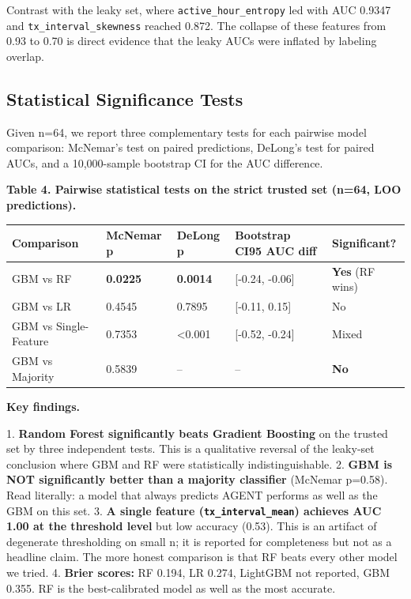 \documentclass[sigconf,nonacm=false]{acmart}
\begin{document}
Contrast with the leaky set, where \texttt{active\_hour\_entropy} led with AUC 0.9347 and \texttt{tx\_interval\_skewness} reached 0.872. The collapse of these features from 0.93 to 0.70 is direct evidence that the leaky AUCs were inflated by labeling overlap.

\subsection{Statistical Significance Tests}

Given n=64, we report three complementary tests for each pairwise model comparison: McNemar's test on paired predictions, DeLong's test for paired AUCs, and a 10,000-sample bootstrap CI for the AUC difference.

\textbf{Table 4. Pairwise statistical tests on the strict trusted set (n=64, LOO predictions).}

\begin{table}[h]
\centering
\small
\begin{tabular}{lllll}
\toprule
Comparison & McNemar p & DeLong p & Bootstrap CI95 AUC diff & Significant? \\
\midrule
GBM vs RF & \textbf{0.0225} & \textbf{0.0014} & [-0.24, -0.06] & \textbf{Yes} (RF wins) \\
GBM vs LR & 0.4545 & 0.7895 & [-0.11, 0.15] & No \\
GBM vs Single-Feature & 0.7353 & <0.001 & [-0.52, -0.24] & Mixed \\
GBM vs Majority & 0.5839 & -- & -- & \textbf{No} \\
\bottomrule
\end{tabular}
\end{table}

\textbf{Key findings.}

1. \textbf{Random Forest significantly beats Gradient Boosting} on the trusted set by three independent tests. This is a qualitative reversal of the leaky-set conclusion where GBM and RF were statistically indistinguishable.
2. \textbf{GBM is NOT significantly better than a majority classifier} (McNemar p=0.58). Read literally: a model that always predicts AGENT performs as well as the GBM on this set.
3. \textbf{A single feature (\texttt{tx\_interval\_mean}) achieves AUC 1.00 at the threshold level} but low accuracy (0.53). This is an artifact of degenerate thresholding on small n; it is reported for completeness but not as a headline claim. The more honest comparison is that RF beats every other model we tried.
4. \textbf{Brier scores:} RF 0.194, LR 0.274, LightGBM not reported, GBM 0.355. RF is the best-calibrated model as well as the most accurate.
\end{document}
